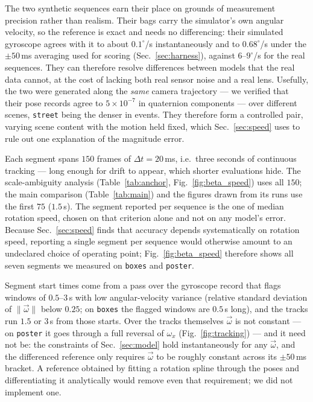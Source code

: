 \documentclass[journal]{IEEEtran}
\newcommand{\wvec}{\vec{\omega}}
\begin{document}
The two synthetic sequences earn their place on grounds of measurement precision
rather than realism. Their bags carry the simulator's own angular velocity, so
the reference is exact and needs no differencing: their simulated gyroscope
agrees with it to about $0.1^\circ$/s instantaneously and to $0.68^\circ$/s
under the $\pm50$\,ms averaging used for scoring (Sec.~\ref{sec:harness}),
against $6$--$9^\circ$/s for the real sequences. They can therefore resolve
differences between models that the real data cannot, at the cost of lacking
both real sensor noise and a real lens.
Usefully, the two were generated along the \emph{same} camera trajectory --- we
verified that their pose records agree to $5\times10^{-7}$ in quaternion
components --- over different scenes, \texttt{street} being the denser in
events. They therefore form a
controlled pair, varying scene content with the motion held fixed, which
Sec.~\ref{sec:speed} uses to rule out one explanation of the magnitude error.

Each segment spans $150$ frames of $\Delta t = 20$\,ms, i.e.\ three seconds of
continuous tracking --- long enough for drift to appear, which shorter
evaluations hide. The scale-ambiguity analysis (Table~\ref{tab:anchor},
Fig.~\ref{fig:beta_speed}) uses all $150$; the main comparison
(Table~\ref{tab:main}) and the figures drawn from its runs use the first $75$
($1.5$\,s). The segment reported per sequence is the one of median
rotation speed, chosen on that criterion alone and not on any model's error.
Because Sec.~\ref{sec:speed} finds that accuracy depends systematically on
rotation speed, reporting a single segment per sequence would otherwise amount
to an undeclared choice of operating point; Fig.~\ref{fig:beta_speed} therefore
shows all seven segments we measured on \texttt{boxes} and \texttt{poster}.

Segment start times come from a pass over the gyroscope record that flags
windows of $0.5$--$3$\,s with low angular-velocity variance (relative standard
deviation of $\|\wvec\|$ below $0.25$; on \texttt{boxes} the flagged windows
are $0.5$\,s long), and the tracks run $1.5$ or $3$\,s from those starts. Over
the tracks themselves
$\wvec$ is not constant --- on \texttt{poster} it goes through a full reversal of
$\omega_x$ (Fig.~\ref{fig:tracking}) --- and it need not be: the constraints of
Sec.~\ref{sec:model} hold instantaneously for any $\wvec$, and the differenced
reference only requires $\wvec$ to be roughly constant across its $\pm50$\,ms
bracket. A reference obtained by fitting a rotation spline through the poses
and differentiating it analytically would remove even that requirement; we did
not implement one.
\end{document}
